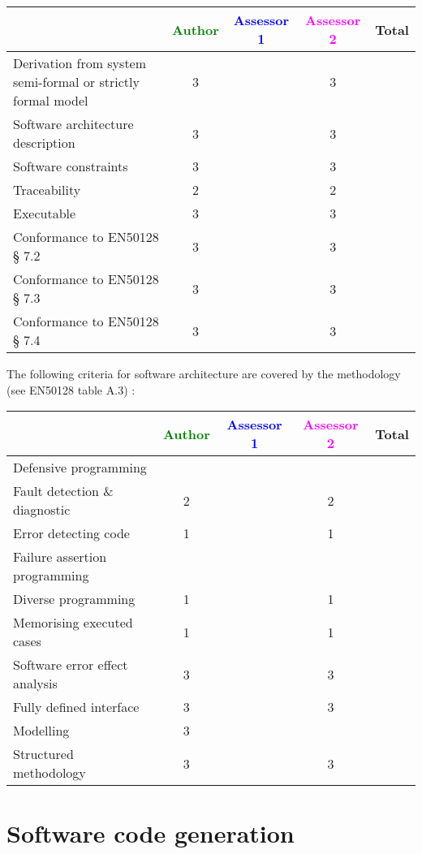 \begin{tabular}{|l | c | c | c | c|}
\hline
& \textcolor{green}{Author} & \textcolor{blue}{Assessor 1} & \textcolor{magenta}{Assessor 2} & Total \\
\hline
Derivation from system semi-formal or strictly formal model  & 3    & & 3    &  \\
\hline 
Software architecture description  & 3    & & 3    &  \\
\hline
Software constraints  & 3    & & 3    &  \\
\hline
Traceability  & 2    & & 2    &  \\
\hline
Executable  & 3    & & 3    &  \\
\hline
Conformance to EN50128 § 7.2  & 3    & & 3    &  \\
\hline
Conformance to EN50128 § 7.3  & 3    & & 3    &  \\
\hline
Conformance to EN50128 § 7.4  & 3    & & 3    &  \\
\hline
\end{tabular}

The following criteria for software architecture are covered by the methodology
(see EN50128 table A.3) :

\begin{tabular}{|l | c | c | c | c|}
\hline
& \textcolor{green}{Author} & \textcolor{blue}{Assessor 1} & \textcolor{magenta}{Assessor 2} & Total \\
\hline
Defensive programming  & & & &  \\
\hline 
Fault detection \& diagnostic  & 2    & & 2    &  \\
\hline
Error detecting code  & 1    & & 1    &  \\
\hline
Failure assertion programming & & & &  \\
\hline
Diverse programming & 1    & & 1    &  \\
\hline
Memorising executed cases & 1    & & 1    &  \\
\hline
Software error effect analysis & 3    & & 3    &  \\
\hline
Fully defined interface & 3    & & 3    &  \\
\hline
Modelling  & 3    & & &  \\
\hline
Structured methodology & 3    & & 3    &  \\
\hline
\end{tabular}

\section{Software code generation}

